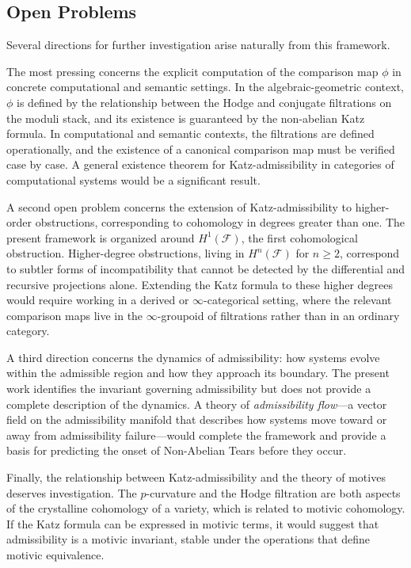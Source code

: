 \documentclass[12pt]{article}
\begin{document}
\subsection{Open Problems}

Several directions for further investigation arise naturally from this framework.

The most pressing concerns the explicit computation of the comparison map $\phi$ in
concrete computational and semantic settings. In the algebraic-geometric context, $\phi$
is defined by the relationship between the Hodge and conjugate filtrations on the moduli
stack, and its existence is guaranteed by the non-abelian Katz formula. In
computational and semantic contexts, the filtrations are defined operationally, and the
existence of a canonical comparison map must be verified case by case. A general
existence theorem for Katz-admissibility in categories of computational systems would
be a significant result.

A second open problem concerns the extension of Katz-admissibility to higher-order
obstructions, corresponding to cohomology in degrees greater than one. The present
framework is organized around $H^1(\mathcal{F})$, the first cohomological obstruction.
Higher-degree obstructions, living in $H^n(\mathcal{F})$ for $n \geq 2$, correspond to
subtler forms of incompatibility that cannot be detected by the differential and
recursive projections alone. Extending the Katz formula to these higher degrees would
require working in a derived or $\infty$-categorical setting, where the relevant
comparison maps live in the $\infty$-groupoid of filtrations rather than in an ordinary
category.

A third direction concerns the dynamics of admissibility: how systems evolve within
the admissible region and how they approach its boundary. The present work identifies
the invariant governing admissibility but does not provide a complete description of
the dynamics. A theory of \emph{admissibility flow}---a vector field on the
admissibility manifold that describes how systems move toward or away from
admissibility failure---would complete the framework and provide a basis for predicting
the onset of Non-Abelian Tears before they occur.

Finally, the relationship between Katz-admissibility and the theory of motives deserves
investigation. The $p$-curvature and the Hodge filtration are both aspects of the
crystalline cohomology of a variety, which is related to motivic cohomology. If the
Katz formula can be expressed in motivic terms, it would suggest that admissibility is
a motivic invariant, stable under the operations that define motivic equivalence.
\end{document}
